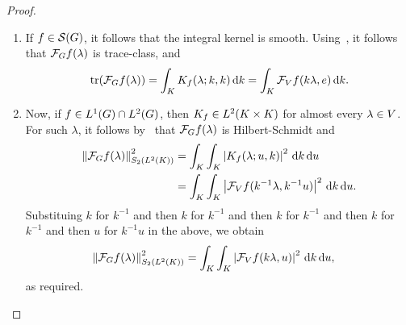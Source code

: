 \begin{proof}
    \begin{enumerate}
        \item If $f \in \Schwartz\Group$, it follows that the integral kernel is smooth.
            Using~\cite[Corollary 4.1]{DelgadoRuzhansky14}, it follows that $\Fourier f(\lambda)$ is trace-class, and
            \begin{align*}
            \tr(\Fourier f(\lambda))
            = \int_\CompactGroup K_f(\lambda; k, k) \dd k
            = \int_\CompactGroup \Fourier[\VectorSpace] f(k \lambda, e) \dd k.
        \end{align*}
    \item Now, if $f \in \Lebesgue{1}\Group \cap \Lebesgue{2}\Group$,
        then $K_{f} \in \Lebesgue{2}{\CompactGroup \times \CompactGroup}$ for almost every $\lambda \in \VectorSpace$.
        For such $\lambda$, it follows by~\cite[Theorem VI.23]{Reed72} that $\Fourier f(\lambda)$ is Hilbert-Schmidt and
        \begin{align*}
            \norm[\SchattenClasses{2}{\Lebesgue{2}\CompactGroup}]{\Fourier f(\lambda)}^2
            &= \int_\CompactGroup \int_\CompactGroup \abs{K_f(\lambda; u, k)}^2 \dd k \dd u\\
            &= \int_\CompactGroup \int_\CompactGroup \abs{\Fourier[\VectorSpace] f(k^{-1} \lambda, k^{-1} u)}^2 \dd k \dd u.
        \end{align*}
        Substituing $k$ for $k^{-1}$ and then $k$ for $k^{-1}$ and then $k$ for $k^{-1}$ and then $k$ for $k^{-1}$ and then $u$ for $k^{-1} u$ in the above, we obtain
        \begin{align*}
            \norm[\SchattenClasses{2}{\Lebesgue{2}\CompactGroup}]{\Fourier f(\lambda)}^2
            &= \int_\CompactGroup \int_\CompactGroup \abs{\Fourier[\VectorSpace] f(k \lambda, u)}^2 \dd k \dd u,
        \end{align*}
        as required.
    \end{enumerate}
\end{proof}

